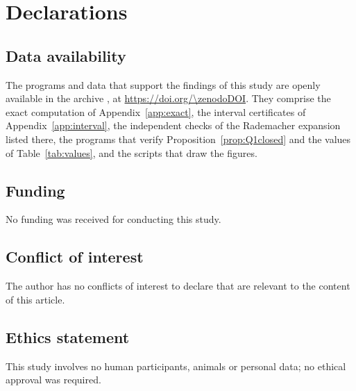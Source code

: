 \section*{Declarations}

\subsection*{Data availability}
The programs and data that support the findings of this study are openly available in the archive \cite{Bha26c}, at \url{https://doi.org/\zenodoDOI}. They comprise the exact computation of Appendix~\ref{app:exact}, the interval certificates of Appendix~\ref{app:interval}, the independent checks of the Rademacher expansion listed there, the programs that verify Proposition~\ref{prop:Q1closed} and the values of Table~\ref{tab:values}, and the scripts that draw the figures.

\subsection*{Funding}
No funding was received for conducting this study.

\subsection*{Conflict of interest}
The author has no conflicts of interest to declare that are relevant to the content of this article.

\subsection*{Ethics statement}
This study involves no human participants, animals or personal data; no ethical approval was required.
